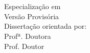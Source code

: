 \begin{center}
\vspace{1cm}
\vfill
\Large{\bf {}\selectfont \Autor}\\
\vspace{1,8 cm}
\vfill
\large{\bf{\selectfont \MDesignacao }}\\
\large{\selectfont Especializa\c{c}\~{a}o em \MEspecializacao}\\
\vspace{0.8cm}
\vfill
\normalsize{\selectfont Versão Provis\'{o}ria}\\
\vspace{0.8cm}
\vfill
\large{\selectfont Disserta\c{c}\~{a}o orientada por:}\\
\large{\selectfont Profª. Doutora \Orientador} \\
\large{\selectfont Prof. Doutor \PCoOrientador} \\
\vspace{1.5 cm}
\vfill

\vfill
\PEIAno
\end{center}
\newpage
\mbox{}

\newpage

\setcounter{page}{1}

